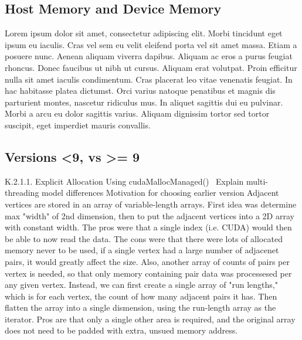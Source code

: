 \subsection{Host Memory and Device Memory}
Lorem ipsum dolor sit amet, consectetur adipiscing elit. Morbi tincidunt eget
ipsum eu iaculis. Cras vel sem eu velit eleifend porta vel sit amet massa. Etiam
a posuere nunc. Aenean aliquam viverra dapibus. Aliquam ac eros a purus feugiat
rhoncus. Donec faucibus ut nibh ut cursus. Aliquam erat volutpat. Proin efficitur
nulla sit amet iaculis condimentum. Cras placerat leo vitae venenatis feugiat. In
hac habitasse platea dictumst. Orci varius natoque penatibus et magnis dis
parturient montes, nascetur ridiculus mus. In aliquet sagittis dui eu pulvinar.
Morbi a arcu eu dolor sagittis varius. Aliquam dignissim tortor sed tortor
suscipit, eget imperdiet mauris convallis.~\cite[p.~00]{todoCitation}\todoCitation
%
\subsection{Versions <9, vs >= 9}
K.2.1.1. Explicit Allocation Using cudaMallocManaged()~\cite[p.~272]{CUDA18}
Explain multi-threading model differences Motivation for choosing earlier
version Adjacent vertices are stored in an array of variable-length arrays.
First idea was determine max "width" of 2nd dimension, then to put the adjacent
vertices into a 2D array with constant width. The pros were that a single index
(i.e. CUDA) would then be able to now read the data.  The cons were that there
were lots of allocated memory never to be used, if a single vertex had a large
number of adjacenet pairs, it would greatly affect the size. Also, another
array of counts of pairs per vertex is needed, so that only memory containing
pair data was processesed per any given vertex. Instead, we can first create a
single array of "run lengths," which is for each vertex, the count of how many
adjacent pairs it has. Then flatten the array into a single dismension, using
the run-length array as the iterator. Pros are that only a single other area is
required, and the original array does not need to be padded with extra, unsued
memory address.
